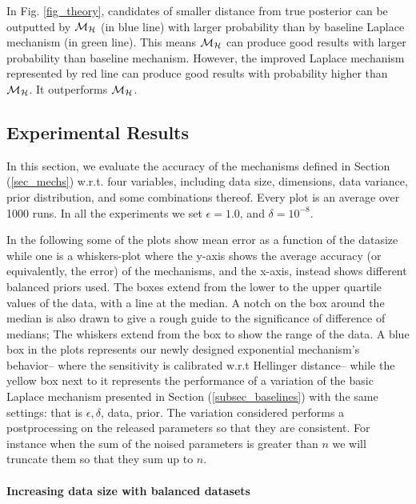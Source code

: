 \documentclass{article}
\begin{document}
In Fig. \ref{fig_theory}, candidates of smaller distance from true posterior can be outputted by $\mathcal{M}_{\mathcal{H}}$ (in blue line) with larger probability than by baseline Laplace mechanism (in green line). This means $\mathcal{M}_{\mathcal{H}}$ can produce good results with larger probability than baseline mechanism. However, the improved Laplace mechanism represented by red line can produce good results with probability higher than $\mathcal{M}_{\mathcal{H}}$. It outperforms $\mathcal{M}_{\mathcal{H}}$.


\subsection{Experimental Results}
\label{subsec_vs_variables}

In this section, we evaluate the accuracy of the mechanisms defined in
Section (\ref{sec_mechs}) w.r.t. four variables, including data size, dimensions,
data variance, prior distribution, and some combinations thereof.
Every plot is an average over 1000 runs. In all the experiments we set
$\epsilon = 1.0$, and $\delta = 10^{-8}$.

\noindent In the following some of the plots show
mean error as a function of the datasize while one
is a whiskers-plot where the y-axis shows the average
accuracy (or equivalently, the error) of the mechanisms, and the x-axis, instead shows
different balanced priors used. The boxes extend from the lower to the upper quartile values
of the data, with a line at the median. A notch on the box around the
median is also drawn to give a rough guide to the significance of
difference of medians; The whiskers extend from the box to show the
range of the data. A blue box in the plots represents our newly
designed exponential mechanism's behavior-- where the sensitivity is calibrated
w.r.t Hellinger distance-- while the yellow box next to
it represents the performance of a variation of the basic Laplace
mechanism presented in Section (\ref{subsec_baselines}) with the same
settings: that is $\epsilon, \delta$, data, prior. The variation
considered performs a postprocessing on the released parameters so
that they are consistent. For instance when the sum of the noised
parameters is greater than $n$ we will truncate them so that they sum
up to $n$.

\paragraph{Increasing data size with balanced datasets}
\label{subsubsec_vs_datasize}
\end{document}
